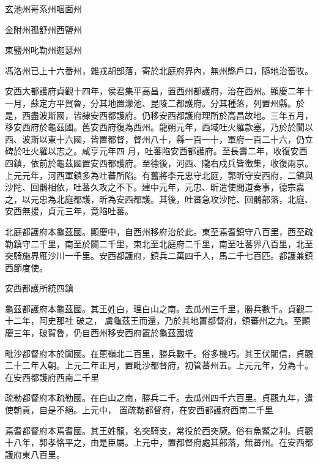 \begin{pinyinscope}
 玄池州哥系州咽面州



 金附州孤舒州西鹽州



 東鹽州叱勒州迦瑟州



 馮洛州已上十六番州，雜戎胡部落，寄於北庭府界內，無州縣戶口，隨地治畜牧。



 安西大都護府貞觀十四年，侯君集平高昌，置西州都護府，治在西州。顯慶二年十一月，蘇定方平賀魯，分其地置濛池、昆陵二都護府。分其種落，列置州縣。於是，西盡波斯國，皆隸安西都護府。仍移安西都護府理所於高昌故地。三年五月，移安西府於龜茲國。舊安西府復為西州。龍朔元年，西域吐火羅款塞，乃於於闐以西、波斯以東十六國，皆置都督，督州八十，縣一百一十，軍府一百二十六，仍立碑於吐火羅以志之。咸亨元年四
 月，吐蕃陷安西都護府。至長壽二年，收復安西四鎮，依前於龜茲國置安西都護府。至德後，河西、隴右戍兵皆徵集，收復兩京。上元元年，河西軍鎮多為吐蕃所陷。有舊將李元忠守北庭，郭昕守安西府，二鎮與沙陀、回鶻相依，吐蕃久攻之不下。建中元年，元忠、昕遣使間道奏事，德宗嘉之，以元忠為北庭都護，昕為安西都護。其後，吐蕃急攻沙陀、回鶻部落，北庭、安西無援，貞元三年，竟陷吐蕃。



 北庭都護府本龜茲國。顯慶中，自西州移府治於此。東至焉耆鎮守八百里，西至疏勒鎮守二千里，南至於闐二千里，東北至北庭府二千里，南至吐蕃界八百里，北至突騎施界雁沙川一千里。安西都護府，鎮兵二萬四千人，馬二千七百匹。都護兼鎮西節度使。



 安西都護所統四鎮


龜茲都護府本龜茲國。其王姓白，理白山之南。去瓜州三千里，勝兵數千。貞觀二十二年，阿史那社
 破之，
 虜龜茲王而還，乃於其地置都督府，領蕃州之九。至顯慶三年，破賀魯，仍自西州移安西府置於龜茲國城



 毗沙都督府本於闐國。在蔥嶺北二百里，勝兵數千。俗多機巧。其王伏闍信，貞觀二十二年入朝。上元二年正月，置毗沙都督府，初管蕃州五。上元元年，分為十。在安西都護府西南二千里



 疏勒都督府本疏勒國。在白山之南，勝兵二千。去瓜州四千六百里。貞觀九年，遣使朝貢，自是不絕。上元中，
 置疏勒都督府，在安西都護府西南二千里



 焉耆都督府本焉耆國。其王姓龍，名突騎支，常役於西突厥。俗有魚鱉之利。貞觀十八年，郭孝恪平之，由是臣屬。上元中，置都督府處其部落，無蕃州。在安西都護府東八百里。




\end{pinyinscope}
